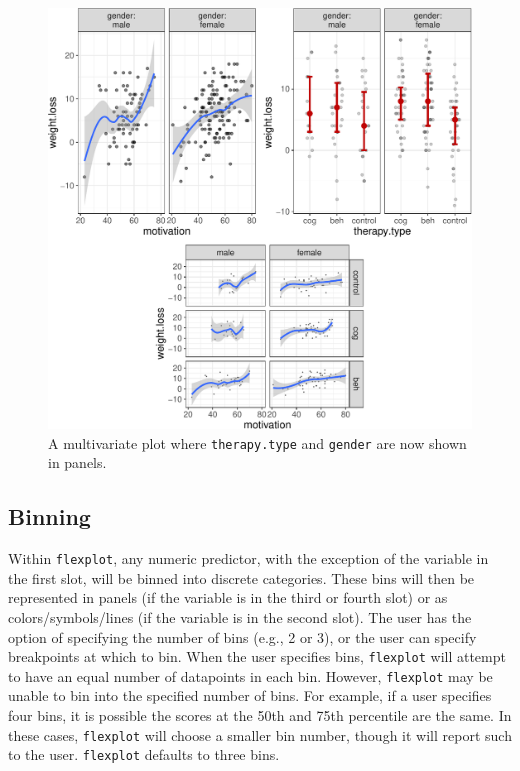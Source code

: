 \documentclass[
  english,
  man]{apa6}
\begin{document}
\begin{figure}
\centering
\includegraphics{flexplot_psychmeth_files/figure-latex/panels-1.pdf}
\caption{\label{fig:panels}A multivariate plot where \texttt{therapy.type} and \texttt{gender} are now shown in panels. \label{fig:panels}}
\end{figure}

\normalsize

\hypertarget{binning}{%
\subsection{Binning}\label{binning}}

Within \texttt{flexplot}, any numeric predictor, with the exception of the variable in the first slot, will be binned into discrete categories. These bins will then be represented in panels (if the variable is in the third or fourth slot) or as colors/symbols/lines (if the variable is in the second slot). The user has the option of specifying the number of bins (e.g., 2 or 3), or the user can specify breakpoints at which to bin. When the user specifies bins, \texttt{flexplot} will attempt to have an equal number of datapoints in each bin. However, \texttt{flexplot} may be unable to bin into the specified number of bins. For example, if a user specifies four bins, it is possible the scores at the 50th and 75th percentile are the same. In these cases, \texttt{flexplot} will choose a smaller bin number, though it will report such to the user. \texttt{flexplot} defaults to three bins.
\end{document}
